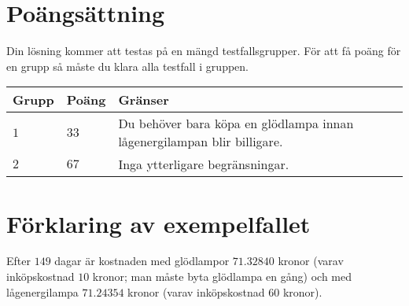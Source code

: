 \section*{Poängsättning}
Din lösning kommer att testas på en mängd testfallsgrupper.
För att få poäng för en grupp så måste du klara alla testfall i gruppen.


\noindent
\begin{tabular}{| l | l | p{12cm} |}
  \hline
  \textbf{Grupp} & \textbf{Poäng} & \textbf{Gränser} \\ \hline
  $1$    & $33$        &  Du behöver bara köpa en glödlampa innan lågenergilampan blir billigare. \\ \hline
  $2$    & $67$        & Inga ytterligare begränsningar. \\ \hline
\end{tabular}


\section*{Förklaring av exempelfallet}
Efter $149$ dagar är kostnaden med glödlampor $71.32840$ kronor (varav inköpskostnad $10$ kronor; man måste byta glödlampa en gång) och med lågenergilampa $71.24354$ kronor (varav inköpskostnad $60$ kronor).
